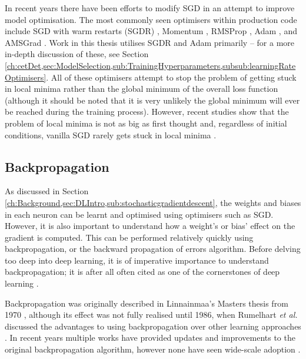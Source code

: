 In recent years there have been efforts to modify SGD in an attempt to improve model optimisation. The most commonly seen optimisers within production code include SGD with warm restarts (SGDR) \cite{loshchilov_sgdr:_2016}, Momentum \cite{qian_momentum_1999}, RMSProp \cite{tieleman_lecture_2012}, Adam \cite{kingma_adam:_2014}, and AMSGrad \cite{reddi_convergence_2019}. Work in this thesis utilises SGDR and Adam primarily -- for a more in-depth discussion of these, see Section \ref{ch:cetDet,sec:ModelSelection,sub:TrainingHyperparameters,subsub:learningRateOptimisers}. All of these optimisers attempt to stop the problem of getting stuck in local minima rather than the global minimum of the overall loss function (although it should be noted that it is very unlikely the global minimum will ever be reached during the training process). However, recent studies show that the problem of local minima is not as big as first thought and, regardless of initial conditions, vanilla SGD rarely gets stuck in local minima \cite{dauphin_identifying_2014, choromanska_loss_2015}.

\subsection{Backpropagation}\label{ch:Background,sec:DLIntro,sub:backprop}

As discussed in Section \ref{ch:Background,sec:DLIntro,sub:stochasticgradientdescent}, the weights and biases in each neuron can be learnt and optimised using optimisers such as SGD. However, it is also important to understand how a weight's or bias' effect on the gradient is computed. This can be performed relatively quickly using backpropagation, or the backward propagation of errors algorithm. Before delving too deep into deep learning, it is of imperative importance to understand backpropagation; it is after all often cited as one of the cornerstones of deep learning \cite{alber_backprop_2018}.

Backpropagation was originally described in Linnainmaa's Masters thesis from 1970 \cite{linnainmaa_representation_1970}, although its effect was not fully realised until 1986, when Rumelhart \textit{et al.} discussed the advantages to using backpropagation over other learning approaches \cite{rumelhart_learning_1986}. In recent years multiple works have provided updates and improvements to the original backpropagation algorithm, however none have seen wide-scale adoption \cite{bengio_use_1994, lillicrap_random_2014, lee_difference_2015, nokland_direct_2016, liao_how_2016}. 

